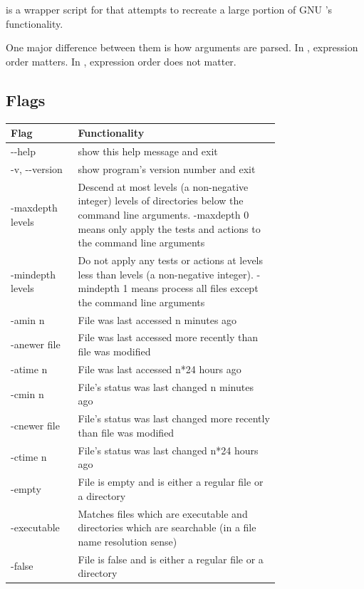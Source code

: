 \section{\gufifind}
\gufifind is a wrapper script for \gufiquery that attempts to recreate
a large portion of GNU \find 's functionality.

One major difference between them is how arguments are parsed. In
\find, expression order matters. In \gufifind, expression order does
not matter.

\subsection{Flags}
\begin{longtable}{|l|p{0.75\linewidth}|}
  \hline
  Flag & Functionality \\
  \hline
  -{}-help & show this help message and exit \\
  \hline
  -v, -{}-version & show program's version number and exit \\
  \hline
  -maxdepth levels & Descend at most levels (a non-negative integer)
  levels of directories below the command line arguments. -maxdepth 0
  means only apply the tests and actions to the command line
  arguments \\
  \hline
  -mindepth levels & Do not apply any tests or actions at levels less
  than levels (a non-negative integer). -mindepth 1 means process all
  files except the command line arguments \\
  \hline
  -amin n & File was last accessed n minutes ago \\
  \hline
  -anewer file & File was last accessed more recently than file was modified \\
  \hline
  -atime n & File was last accessed n*24 hours ago \\
  \hline
  -cmin n & File's status was last changed n minutes ago \\
  \hline
  -cnewer file & File's status was last changed more recently than file was modified \\
  \hline
  -ctime n & File's status was last changed n*24 hours ago \\
  \hline
  -empty & File is empty and is either a regular file or a directory \\
  \hline
  -executable & Matches files which are executable and directories
  which are searchable (in a file name resolution sense) \\
  \hline
  -false & File is false and is either a regular file or a directory \\

\end{longtable}
